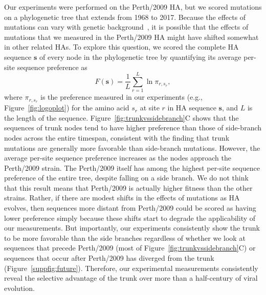 \documentclass[9pt,twocolumn,twoside]{pnas-new}
\begin{document}
Our experiments were performed on the Perth/2009 HA, but we scored mutations on a phylogenetic tree that extends from 1968 to 2017.
Because the effects of mutations can vary with genetic background~\cite{gong2013stability,natarajan2013epistasis,harms2014historical,starr2016epistasis,starr2017alternative}, it is possible that the effects of mutations that we measured in the Perth/2009 HA might have shifted somewhat in other related HAs.
To explore this question, we scored the complete HA sequence $\mathbf{s}$ of every node in the phylogenetic tree by quantifying its average per-site sequence preference as 
\begin{equation}
F\left(\mathbf{s}\right) = \frac{1}{L}\displaystyle\sum_{r=1}^L \ln \pi_{r, s_r},
\end{equation}
where $\pi_{r, s_r}$ is the preference measured in our experiments (e.g., Figure~\ref{fig:logoplot}) for the amino acid $s_r$ at site $r$ in HA sequence $\mathbf{s}$, and $L$ is the length of the sequence.
Figure~\ref{fig:trunkvssidebranch}C shows that the sequences of trunk nodes tend to have higher preference than those of side-branch nodes across the entire timespan, consistent with the finding that trunk mutations are generally more favorable than side-branch mutations. 
However, the average per-site sequence preference increases as the nodes approach the Perth/2009 strain.
The Perth/2009 itself has among the highest per-site sequence preference of the entire tree, despite falling on a side branch.
We do not think that this result means that Perth/2009 is actually higher fitness than the other strains.
Rather, if there are modest shifts in the effects of mutations as HA evolves, then sequences more distant from Perth/2009 could be scored as having lower preference simply because these shifts start to degrade the applicability of our measurements.
But importantly, our experiments consistently show the trunk to be more favorable than the side branches regardless of whether we look at sequences that precede Perth/2009 (most of Figure~\ref{fig:trunkvssidebranch}C) or sequences that occur after Perth/2009 has diverged from the trunk (Figure~\ref{suppfig:future}). 
Therefore, our experimental measurements consistently reveal the selective advantage of the trunk over more than a half-century of viral evolution.
\end{document}
